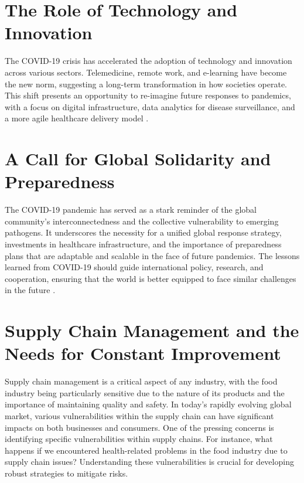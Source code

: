 \section{The Role of Technology and Innovation}

The COVID-19 crisis has accelerated the adoption of technology and innovation across various sectors. Telemedicine, remote work, and e-learning have become the new norm, suggesting a long-term transformation in how societies operate. This shift presents an opportunity to re-imagine future responses to pandemics, with a focus on digital infrastructure, data analytics for disease surveillance, and a more agile healthcare delivery model \parencite{Shrestha2020TheGlobalization, MaitalEllaBarzani2020EResearch}.

\section{A Call for Global Solidarity and Preparedness}

The COVID-19 pandemic has served as a stark reminder of the global community's interconnectedness and the collective vulnerability to emerging pathogens. It underscores the necessity for a unified global response strategy, investments in healthcare infrastructure, and the importance of preparedness plans that are adaptable and scalable in the face of future pandemics. The lessons learned from COVID-19 should guide international policy, research, and cooperation, ensuring that the world is better equipped to face similar challenges in the future \parencite{Verma2021AReturns, Shrestha2020TheGlobalization, LegeseFeyisa2020TheReview, MaitalEllaBarzani2020EResearch}.

\section{Supply Chain Management and the Needs for Constant Improvement}

Supply chain management is a critical aspect of any industry, with the food industry being particularly sensitive due to the nature of its products and the importance of maintaining quality and safety. In today’s rapidly evolving global market, various vulnerabilities within the supply chain can have significant impacts on both businesses and consumers. One of the pressing concerns is identifying specific vulnerabilities within supply chains. For instance, what happens if we encountered health-related problems in the food industry due to supply chain issues? Understanding these vulnerabilities is crucial for developing robust strategies to mitigate risks. 

